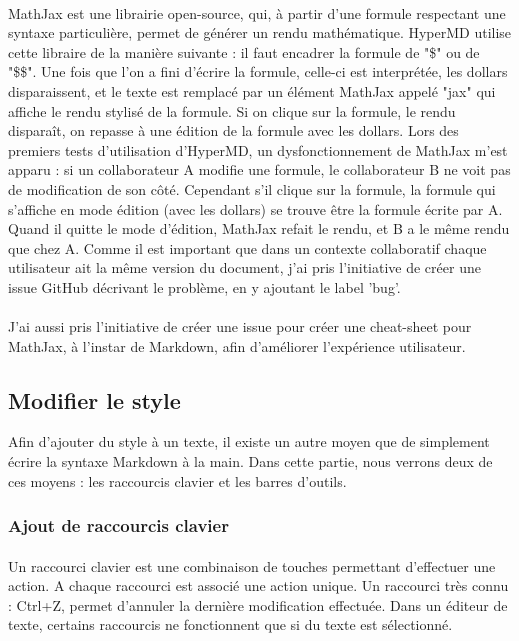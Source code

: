 \documentclass[12pt]{article}
\begin{document}
\paragraph{}
MathJax est une librairie open-source, qui, à partir d'une formule respectant une syntaxe particulière, permet de générer un rendu mathématique. HyperMD utilise cette libraire de la manière suivante : il faut encadrer la formule de "\$" ou de "\$\$". Une fois que l'on a fini d'écrire la formule, celle-ci est interprétée, les dollars disparaissent, et le texte est remplacé par un élément MathJax appelé "jax" qui affiche le rendu stylisé de la formule. Si on clique sur la formule, le rendu disparaît, on repasse à une édition de la formule avec les dollars. Lors des premiers tests d'utilisation d'HyperMD, un dysfonctionnement de MathJax m'est apparu : si un collaborateur A modifie une formule, le collaborateur B ne voit pas de modification de son côté. Cependant s'il clique sur la formule, la formule qui s'affiche en mode édition (avec les dollars) se trouve être la formule écrite par A. Quand il quitte le mode d'édition, MathJax refait le rendu, et B a le même rendu que chez A. Comme il est important que dans un contexte collaboratif chaque utilisateur ait la même version du document, j'ai pris l'initiative de créer une issue GitHub décrivant le problème, en y ajoutant le label 'bug'.
\paragraph{}
J'ai aussi pris l'initiative de créer une issue pour créer une cheat-sheet pour MathJax, à l'instar de Markdown, afin d'améliorer l'expérience utilisateur.\\

\newpage
\subsection{Modifier le style}
Afin d'ajouter du style à un texte, il existe un autre moyen que de simplement écrire la syntaxe Markdown à la main. Dans cette partie, nous verrons deux de ces moyens : les raccourcis clavier et les barres d'outils.

\subsubsection{Ajout de raccourcis clavier}
\paragraph{}
Un raccourci clavier est une combinaison de touches permettant d'effectuer une action. A chaque raccourci est associé une action unique. Un raccourci très connu : Ctrl+Z, permet d'annuler la dernière modification effectuée. Dans un éditeur de texte, certains raccourcis ne fonctionnent que si du texte est sélectionné.
\end{document}
